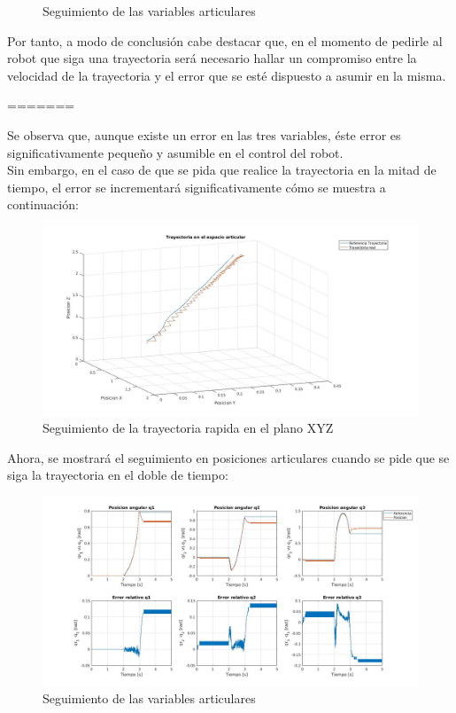 \begin{itemize}
\begin{figure}[h!]
		\caption{Seguimiento de las variables articulares}
		
	\end{figure}
	
	
	
	Por tanto, a modo de conclusión cabe destacar que, en el momento de pedirle al robot que siga una trayectoria será necesario hallar un compromiso entre la velocidad de la trayectoria y el error que se esté dispuesto a asumir en la misma.\\
	
	
	
	\newpage
	
=======

\newpage
Se observa que, aunque existe un error en las tres variables, éste error es significativamente pequeño y asumible en el control del robot.\\
Sin embargo, en el caso de que se pida que realice la trayectoria en la mitad de tiempo, el error se incrementará significativamente cómo se muestra a continuación:

\begin{figure}[h!]
	\centering
	\includegraphics[width=.8\textwidth]{exp4_trayPDidealSR_rapido}
	\caption{Seguimiento de la trayectoria rapida en el plano XYZ}
\end{figure}

\newpage
Ahora, se mostrará el seguimiento en posiciones articulares cuando se pide que se siga la trayectoria en el doble de tiempo:

\begin{figure}[h!]
	\centering
	\includegraphics[width=.8\textwidth]{exp4_posPDidealSR_rapido}
	\caption{Seguimiento de las variables articulares}
\end{figure}


\end{itemize}

